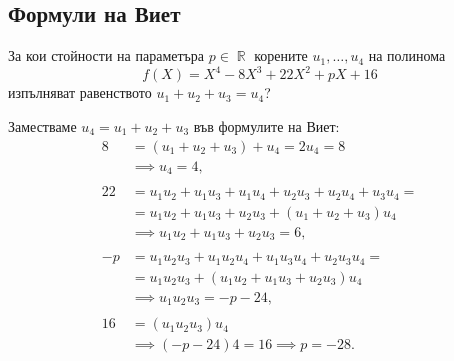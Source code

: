 \documentclass{../../common/topic}
\begin{document}
\subsection{Формули на Виет}

\begin{problem}
  За кои стойности на параметъра \( p \in \BbbR \) корените \( u_1, \ldots, u_4 \) на полинома
  \begin{equation*}
    f(X) = X^4 - 8X^3 + 22X^2 + pX + 16
  \end{equation*}
  изпълняват равенството \( u_1 + u_2 + u_3 = u_4 \)?
\end{problem}
\begin{solution}
  Заместваме \( u_4 = u_1 + u_2 + u_3 \) във формулите на Виет:
  \begin{align*}
    8 &= (u_1 + u_2 + u_3) + u_4 = 2u_4 = 8
    \\&\implies
    u_4 = 4,
    \\ \\
    22 &= u_1 u_2 + u_1 u_3 + u_1 u_4 + u_2 u_3 + u_2 u_4 + u_3 u_4 = \\ &= u_1 u_2 + u_1 u_3 + u_2 u_3 + (u_1 + u_2 + u_3) u_4
    \\&\implies
    u_1 u_2 + u_1 u_3 + u_2 u_3 = 6,
    \\ \\
    -p &= u_1 u_2 u_3 + u_1 u_2 u_4 + u_1 u_3 u_4 + u_2 u_3 u_4 = \\ &= u_1 u_2 u_3 + (u_1 u_2 + u_1 u_3 + u_2 u_3) u_4 \\&\implies
    u_1 u_2 u_3 = -p - 24,
    \\ \\
    16 &= (u_1 u_2 u_3) u_4
    \\&\implies
    (-p - 24) 4 = 16 \implies p = -28.
  \end{align*}
\end{solution}

\begin{sloppypar}
  \printbibliography
\end{sloppypar}
\end{document}
